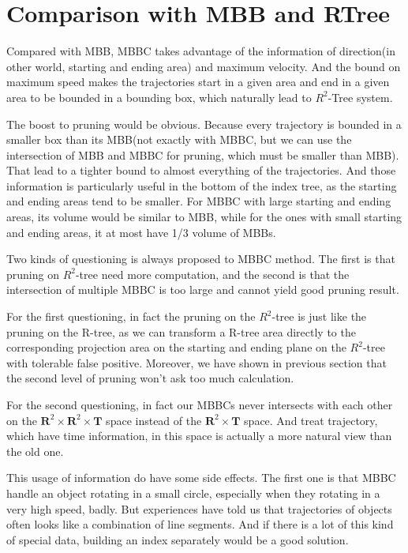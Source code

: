 \documentclass[sigplan]{acmart}
\begin{document}
\section{Comparison with MBB and RTree}
Compared with MBB, MBBC takes advantage of the information of direction(in other world, starting and ending area) and maximum velocity. And the bound on maximum speed makes the trajectories start in a given area and end in a given area to be bounded in a bounding box, which naturally lead to $R^2$-Tree system.\par
The boost to pruning would be obvious. Because every trajectory is bounded in a smaller box than its MBB(not exactly with MBBC, but we can use the intersection of MBB and MBBC for pruning, which must be smaller than MBB). That lead to a tighter bound to almost everything of the trajectories. And those information is particularly useful in the bottom of the index tree, as the starting and ending areas tend to be smaller. For MBBC with large starting and ending areas, its volume would be similar to MBB, while for the ones with small starting and ending areas, it at most have 1/3 volume of MBBs.\par
Two kinds of questioning is always proposed to MBBC method. The first is that pruning on $R^2$-tree need more computation, and the second is that the intersection of multiple MBBC is too large and cannot yield good pruning result.\par
For the first questioning, in fact the pruning on the $R^2$-tree is just like the pruning on the R-tree, as we can transform a R-tree area directly to the corresponding projection area on the starting and ending plane on the $R^2$-tree with tolerable false positive. Moreover, we have shown in previous section that the second level of pruning won't ask too much calculation.\par
For the second questioning, in fact our MBBCs never intersects with each other on the $\mathbf{R}^2 \times \mathbf{R}^2 \times \mathbf{T}$ space instead of the $\mathbf{R}^2 \times \mathbf{T}$ space. And treat trajectory, which have time information, in this space is actually a more natural view than the old one.\par
This usage of information do have some side effects. The first one is that MBBC handle an object rotating in a small circle, especially when they rotating in a very high speed, badly. But experiences have told us that trajectories of objects often looks like a combination of line segments. And if there is a lot of this kind of special data, building an index separately would be a good solution. 
\end{document}
